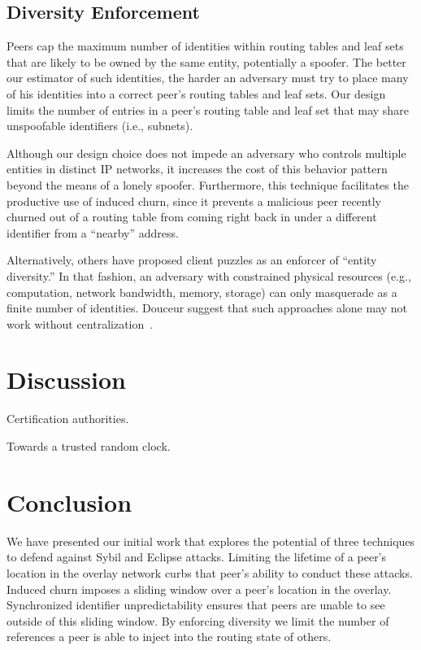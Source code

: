 \documentclass[11pt,twocolumn]{MyTightStyle}
\begin{document}
\subsection{Diversity Enforcement}

Peers cap the maximum number of identities within routing tables and
leaf sets that are likely to be owned by the same entity, potentially a
spoofer.  The better our estimator of such identities, the harder an
adversary must try to place many of his identities into a correct peer's
routing tables and leaf sets.  Our design limits the number of entries
in a peer's routing table and leaf set that may share unspoofable
identifiers (i.e., subnets).

Although our design choice  does not impede an adversary who
controls multiple entities in distinct IP networks, it increases 
the cost of this behavior pattern beyond the means of a lonely spoofer.
Furthermore, this technique facilitates the productive use of induced
churn, since it prevents a malicious peer recently churned out of a
routing table from coming right back in under a different identifier
from a ``nearby'' address.

Alternatively, others have proposed client puzzles as an enforcer of
``entity diversity.''  In that fashion, an adversary with constrained
physical resources (e.g., computation, network bandwidth, memory,
storage) can only masquerade as a finite number of identities.  Douceur
suggest that such approaches alone may not work without
centralization~\cite{Douceur2002short}.








\section{Discussion}
\label{sec:futureWork}



Certification authorities.

Towards a trusted random clock.


\section{Conclusion}
We have presented our initial work that explores the potential of three techniques
to defend against Sybil and Eclipse attacks. Limiting the lifetime of a peer's 
location in the overlay network curbs that peer's ability to conduct these 
attacks. Induced churn imposes a sliding window over a peer's location in the 
overlay. Synchronized identifier unpredictability ensures that peers are unable 
to see outside of this sliding window. By enforcing diversity we limit the number
of references a peer is able to inject into the routing state of others. 
\end{document}
